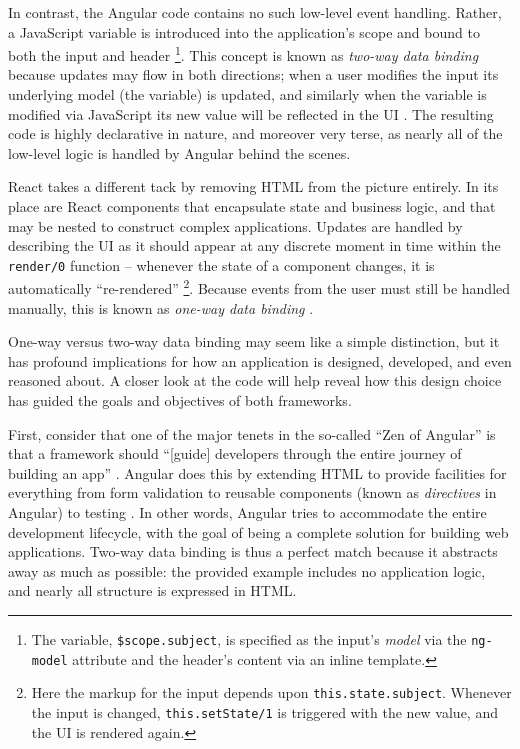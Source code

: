 \documentclass[12pt,letterpaper]{article}
\begin{document}
In contrast, the Angular code contains no such low-level event handling. Rather, a JavaScript variable is introduced into the application's scope and bound to both the input and header \footnote{The variable, \texttt{\$scope.subject}, is specified as the input's \emph{model} via the \texttt{ng-model} attribute and the header's content via an inline template.}. This concept is known as \emph{two-way data binding} because updates may flow in both directions; when a user modifies the input its underlying model (the variable) is updated, and similarly when the variable is modified via JavaScript its new value will be reflected in the UI \cite{Angular:Docs}. The resulting code is highly declarative in nature, and moreover very terse, as nearly all of the low-level logic is handled by Angular behind the scenes.

React takes a different tack by removing HTML from the picture entirely. In its place are React components that encapsulate state and business logic, and that may be nested to construct complex applications. Updates are handled by describing the UI as it should appear at any discrete moment in time within the \texttt{render/0} function -- whenever the state of a component changes, it is automatically ``re-rendered'' \footnote{Here the markup for the input depends upon \texttt{this.state.subject}. Whenever the input is changed, \texttt{this.setState/1} is triggered with the new value, and the UI is rendered again.}. Because events from the user must still be handled manually, this is known as \emph{one-way data binding} \cite{Hunt:2014}.

One-way versus two-way data binding may seem like a simple distinction, but it has profound implications for how an application is designed, developed, and even reasoned about. A closer look at the code will help reveal how this design choice has guided the goals and objectives of both frameworks.

First, consider that one of the major tenets in the so-called ``Zen of Angular'' is that a framework should ``[guide] developers through the entire journey of building an app'' \cite[p.~1]{Angular:Docs}. Angular does this by extending HTML to provide facilities for everything from form validation to reusable components (known as \emph{directives} in Angular) to testing \cite{Green:2013}. In other words, Angular tries to accommodate the entire development lifecycle, with the goal of being a complete solution for building web applications. Two-way data binding is thus a perfect match because it abstracts away as much as possible: the provided example includes no application logic, and nearly all structure is expressed in HTML.
\end{document}
